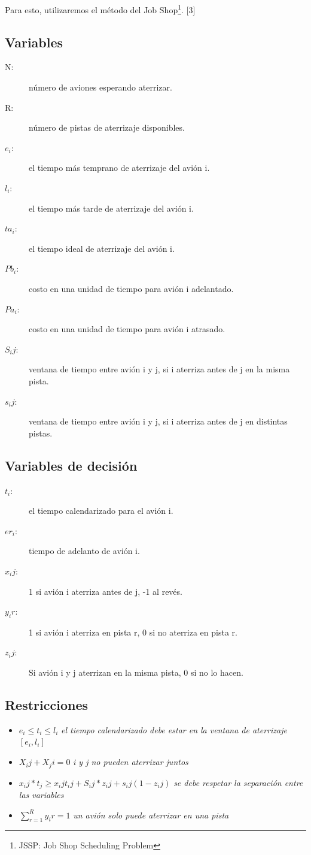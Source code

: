 \documentclass[letter, 11pt]{article}
\begin{document}
Para esto, utilizaremos el método del Job Shop\footnote{JSSP: Job Shop Scheduling Problem}. [3]

\subsection{Variables}
\begin{description}
\item[N:] número de aviones esperando aterrizar.
\item[R:] número de pistas de aterrizaje disponibles.
\item[$e_i$:] el tiempo más temprano de aterrizaje del avión i.
\item[$l_i$:] el tiempo más tarde de aterrizaje del avión i.
\item[$ta_i$:] el tiempo ideal de aterrizaje del avión i.
\item[$Pb_i$:] costo en una unidad de tiempo para avión i adelantado.
\item[$Pa_i$:] costo en una unidad de tiempo para avión i atrasado.
\item[$S_ij$:] ventana de tiempo entre avión i y j, si i aterriza antes de j en la misma pista.
\item[$s_ij$:] ventana de tiempo entre avión i y j, si i aterriza antes de j en distintas pistas. 
\end{description}

\subsection{Variables de decisión}
\begin{description}
\item[$t_i$:] el tiempo calendarizado para el avión i.
\item[$er_i$:]tiempo de adelanto de avión i.
\item[$x_ij$:] 1 si avión i aterriza antes de j, -1 al revés.
\item[$y_ir$:] 1 si avión i aterriza en pista r, 0 si no aterriza en pista r.
\item[$z_ij$:] Si avión i y j aterrizan en la misma pista, 0 si no lo hacen.
\end{description}

\subsection{Restricciones}
\begin{itemize}
\item $e_i\leq t_i\leq l_i$ \textit{el tiempo calendarizado debe estar en la ventana de aterrizaje $[e_i,l_i]$}
\item $X_ij + X_ji = 0$ \textit{i y j no pueden aterrizar juntos}
\item $x_ij * t_j \geq x_ij t_ij + S_ij * z_ij + s_ij(1-z_ij)$ \textit{se debe respetar la separación entre las variables}
\item $\sum\limits_{r=1}^R y_ir = 1$ \textit{un avión solo puede aterrizar en una pista}
\end{itemize}
\end{document}
